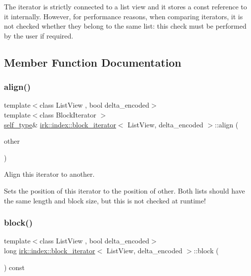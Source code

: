 The iterator is strictly connected to a list view and it stores a const reference to it internally. However, for performance reasons, when comparing iterators, it is not checked whether they belong to the same list\+: this check must be performed by the user if required. 

\subsection{Member Function Documentation}
\mbox{\label{classirk_1_1index_1_1block__iterator_a901a557c429c737587e30b123bfc1641}} 
\subsubsection{\texorpdfstring{align()}{align()}}
{\footnotesize\ttfamily template$<$class List\+View , bool delta\+\_\+encoded$>$ \\
template$<$class Block\+Iterator $>$ \\
\mbox{\hyperlink{classirk_1_1index_1_1block__iterator_a338ee8fee726492e9f8bbad4b4d75766}{self\+\_\+type}}\& \mbox{\hyperlink{classirk_1_1index_1_1block__iterator}{irk\+::index\+::block\+\_\+iterator}}$<$ List\+View, delta\+\_\+encoded $>$\+::align (\begin{DoxyParamCaption}\item[{const Block\+Iterator \&}]{other }\end{DoxyParamCaption})\hspace{0.3cm}{\ttfamily [inline]}}



Align this iterator to another. 

Sets the position of this iterator to the position of {\ttfamily other}. Both lists should have the same length and block size, but this is not checked at runtime! \mbox{\label{classirk_1_1index_1_1block__iterator_ae172ebede460597574078b85ae820a4c}} 
\subsubsection{\texorpdfstring{block()}{block()}}
{\footnotesize\ttfamily template$<$class List\+View , bool delta\+\_\+encoded$>$ \\
long \mbox{\hyperlink{classirk_1_1index_1_1block__iterator}{irk\+::index\+::block\+\_\+iterator}}$<$ List\+View, delta\+\_\+encoded $>$\+::block (\begin{DoxyParamCaption}{ }\end{DoxyParamCaption}) const\hspace{0.3cm}{\ttfamily [inline]}}



